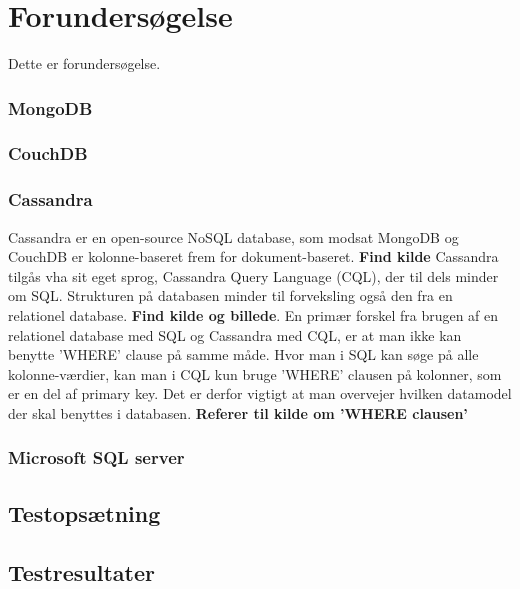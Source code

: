\section{Forundersøgelse}
Dette er forundersøgelse.


\subsubsection{MongoDB}
\subsubsection{CouchDB}
\subsubsection{Cassandra}
Cassandra er en open-source NoSQL database, som modsat MongoDB og CouchDB er kolonne-baseret frem for dokument-baseret. \textbf{Find kilde} Cassandra tilgås vha sit eget sprog, Cassandra Query Language (CQL), der til dels minder om SQL. Strukturen på databasen minder til forveksling også den fra en relationel database. \textbf{Find kilde og billede}.
En primær forskel fra brugen af en relationel database med SQL og Cassandra med CQL, er at man ikke kan benytte 'WHERE' clause på samme måde. Hvor man i SQL kan søge på alle kolonne-værdier, kan man i CQL kun bruge 'WHERE' clausen på kolonner, som er en del af primary key. Det er derfor vigtigt at man overvejer hvilken datamodel der skal benyttes i databasen. \textbf{Referer til kilde om 'WHERE clausen'}

\subsubsection{Microsoft SQL server}

\subsection{Testopsætning}

\subsection{Testresultater}